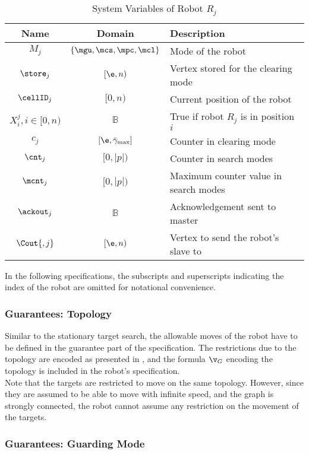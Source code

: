 \begin{table}
\centering
\begin{tabular}{c|c|l}
\hline
Name & Domain & Description \\
\hline
$M_j$ & $\{\mgu, \mcs, \mpc, \mcl\}$ & Mode of the robot \\
$\store_j$ & $[\e, n)$ & Vertex stored for the clearing mode\\
$\cellID_j$ & $[0, n)$ & Current position of the robot \\
$X_i^j, i \in [0, n)$ & $\mathbb{B}$ & True if robot $R_j$ is in position $i$\\
$c_j$ & $[\e, \bar{\gamma}_\mathrm{max}]$ & Counter in clearing mode\\
$\cnt_j$ & $[0, |p|)$ & Counter in search modes\\
$\mcnt_j$ & $[0, |p|)$ & Maximum counter value in search modes\\
$\ackout_j$ & $\mathbb{B}$ & Acknowledgement sent to master \\
$\Cout{,j}$ & $[\e, n)$ & Vertex to send the robot's slave to \\
\hline
\end{tabular}
\caption{System Variables of Robot $R_j$}
\label{tab:out:robot}
\end{table}

In the following specifications, the subscripts and superscripts indicating the index of the robot are omitted for notational convenience.\\


\subsubsection{Guarantees: Topology}

Similar to the stationary target search, the allowable moves of the robot have to be defined in the guarantee part of the specification. The restrictions due to the topology are encoded as presented in , and the formula $\v_G$ encoding the topology is included in the robot's specification.\\

Note that the targets are restricted to move on the same topology. However, since they are assumed to be able to move with infinite speed, and the graph is strongly connected, the robot cannot assume any restriction on the movement of the targets.\\


\subsubsection{Guarantees: Guarding Mode}

